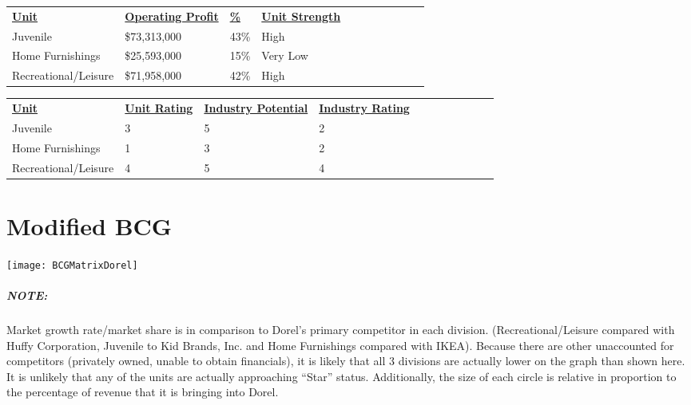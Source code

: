 {\begin{table}[h]
    \begin{tabular}{lllllllllll}
    {\bf \underline{Unit}}             &  {\bf \underline{Operating Profit}} & {\bf \underline{\%}}  & {\bf \underline{Unit Strength}} \\
    Juvenile             & \$73,313,000     & 43\% & High \\
    Home Furnishings     & \$25,593,000     & 15\% & Very Low \\
    Recreational/Leisure  & \$71,958,000     & 42\% & High \\
    \end{tabular}
\end{table}

\begin{table}[h]
    \begin{tabular}{lllllllllll}
    {\bf \underline{Unit}}               &{\bf \underline{Unit Rating}} &  {\bf \underline{Industry Potential}} &{\bf \underline{Industry Rating}} \\
    Juvenile             & 3           & 5                  & 2               \\
    Home Furnishings      & 1           & 3                  & 2               \\
    Recreational/Leisure  & 4           & 5                  & 4               \\
    \end{tabular}
\end{table}

\chapter{Modified BCG}
\label{chp:bcg}
\centerline{\texttt{[image: BCGMatrixDorel]}}
\paragraph{NOTE:}Market growth rate/market share is in comparison to Dorel’s primary competitor in each division.  (Recreational/Leisure compared with Huffy Corporation, Juvenile to Kid Brands, Inc. and Home Furnishings compared with IKEA).  Because there are other unaccounted for competitors (privately owned, unable to obtain financials), it is likely that all 3 divisions are actually lower on the graph than shown here.  It is unlikely that any of the units are actually approaching “Star” status.  Additionally, the size of each circle is relative in proportion to the percentage of revenue that it is bringing into Dorel.
}

